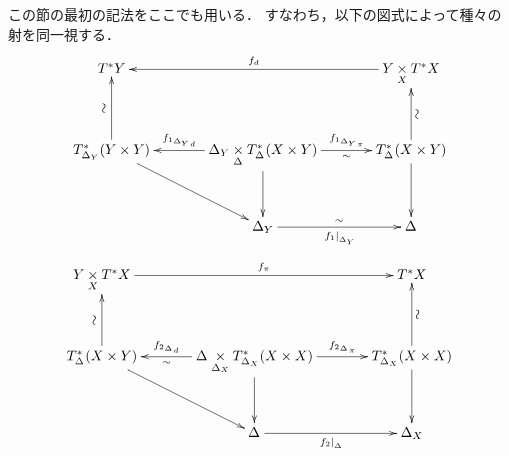 \documentclass[leqno, 10pt, a4paper, dvipdfmx]{jsarticle}
\makeatletter
\theoremstyle{definition}
\renewenvironment{proof}[1][\proofname]{\par
  \pushQED{\qed}%
  \normalfont \topsep6\p@\@plus6\p@\relax
  \trivlist
  \item[\hskip\labelsep
         \bfseries
    {#1}]\ignorespaces
}{%
  \popQED\endtrivlist\@endpefalse
}
\renewcommand{\proofname}{証明.}
\numberwithin{equation}{section}
\newcommand{\mres}[2][]{{\left.{#1}\right\rvert}_{#2}}
\newcommand{\dpb}[1][]{\mathbin{\mathop{\times}\limits_{#1}}}
\theoremstyle{mystyle}
\newcommand{\mpb}[1][]{{#1}_{\pi}} %
\newcommand{\mdiff}[1][]{{#1}_{d}} %
\newcommand{\cotb}[1][]{T^{\ast}{#1}}
\newcommand{\diag}[1][]{\Delta_{#1}}
\makeatother
\begin{document}
\begin{proof}
  この節の最初の記法をここでも用いる．
  すなわち，以下の図式によって種々の射を同一視する．
  \[
  \vcenter{\xymatrix@C=36pt@R=36pt{
    \cotb[Y]
    &
    &
    Y\dpb[X]\cotb[X]
    \ar[ll]_-{\mdiff[f]}
    \\
    T^{\ast}_{\diag[Y]}(Y\times Y)
    \ar[dr]^-{}
    \ar[u]^-{\rotatebox{90}{\(\sim\)}}
    &
    \diag[Y]\dpb[{\diag[]}]T^{\ast}_{\diag[]}(X\times Y)
    \ar[d]^-{}
    \ar[l]_-{\mdiff[{f_1}_{\diag[Y]}]}
    \ar[r]^-{\mpb[{f_1}_{\diag[Y]}]}_-{\sim}
    &
    T^{\ast}_{\diag[]}(X\times Y)
    \ar[d]^-{}
    \ar[u]_-{\rotatebox{90}{\(\sim\)}}
    \\
    &
    \diag[Y]
    \ar[r]_-{\mres[f_1]{\diag[Y]}}^-{\sim}
    &
    \diag[]
  }}\]
  \[
  \vcenter{\xymatrix@C=36pt@R=36pt{
    Y\dpb[X]\cotb[X]
    \ar[rr]^-{\mpb[f]}
    &
    &
    \cotb[X]
    \\
    T^{\ast}_{\diag[]}(X\times Y)
    \ar[dr]^-{}
    \ar[u]^-{\rotatebox{90}{\(\sim\)}}
    &
    \diag[]\dpb[{\diag[X]}]T^{\ast}_{\diag[X]}(X\times X)
    \ar[d]^-{}
    \ar[l]_-{\mdiff[{f_2}_{\diag[]}]}^-{\sim}
    \ar[r]^-{\mpb[{f_2}_{\diag[]}]}
    &
    T^{\ast}_{\diag[X]}(X\times X)
    \ar[d]^-{}
    \ar[u]_-{\rotatebox{90}{\(\sim\)}}
    \\
    &
    \diag[]
    \ar[r]_-{\mres[f_2]{\diag[]}}%
    &
    \diag[X]
  }}\]


\end{proof}
\end{document}
